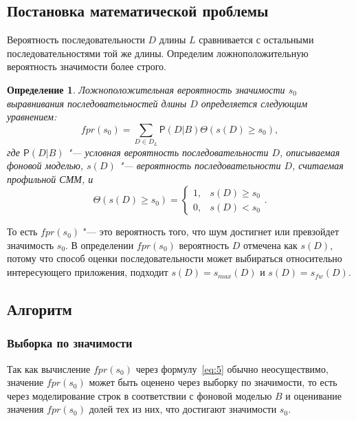 \documentclass[specialist,
substylefile = spbu_report.rtx,
subf,href,colorlinks=true, 12pt]{disser}
\newtheorem{defenition}{Определение}
\begin{document}
			\subsection{Постановка математической проблемы}
			Вероятность последовательности $D$ длины $L$ сравнивается с остальными последовательностями той же длины. Определим ложноположительную вероятность значимости более строго.
			\begin{defenition}
				Ложноположительная вероятность значимости $s_{0}$ выравнивания последовательностей длины $D$ определяется следующим уравнением:
				\begin{equation}
					fpr(s_{0}) =  \sum_{D \in D_{L}} \mathsf{P}(D|B) \Theta(s(D) \geq s_{0}), \label{eq:5}
				\end{equation}
				где $\mathsf{P}(D|B)$ "--- условная вероятность последовательности $D$, описываемая фоновой моделью, $s(D)$ "--- вероятность последовательности $D$, считаемая профильной СММ, и
				\[
				\Theta(s(D) \geq s_{0}) = 
				\begin{cases}
					1, & s(D) \geq s_{0}\\
					0, & s(D) < s_{0}
				\end{cases}.
				\]
			\end{defenition}			
			То есть $fpr(s_{0})$ "--- это вероятность того, что шум достигнет или превзойдет значимость $s_{0}$. В определении $fpr(s_{0})$ вероятность $D$ отмечена как $s(D)$, потому что способ оценки последовательности может выбираться относительно интересующего приложения, подходит $s(D) = s_{max}(D)$ и $s(D) = s_{fw}(D)$.
			
			\subsection{Алгоритм}
			\subsubsection{Выборка по значимости}
			Так как вычисление $fpr(s_{0})$ через формулу~\eqref{eq:5} обычно неосуществимо, значение $fpr(s_{0})$ может быть оценено через выборку по значимости, то есть через моделирование строк в соответствии с фоновой моделью $B$ и оценивание значения $fpr(s_{0})$ долей тех из них, что достигают значимости $s_{0}$.
			
\end{document}
